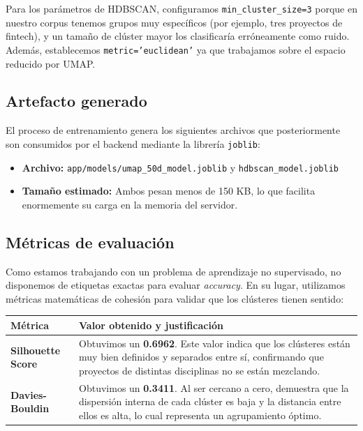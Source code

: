 Para los parámetros de HDBSCAN, configuramos \texttt{min\_cluster\_size=3} porque en nuestro corpus tenemos grupos muy específicos (por ejemplo, tres proyectos de fintech), y un tamaño de clúster mayor los clasificaría erróneamente como ruido. Además, establecemos \texttt{metric='euclidean'} ya que trabajamos sobre el espacio reducido por UMAP.

\subsection{Artefacto generado}

El proceso de entrenamiento genera los siguientes archivos que posteriormente son consumidos por el backend mediante la librería \texttt{joblib}:

\begin{itemize}
  \item \textbf{Archivo:} \texttt{app/models/umap\_50d\_model.joblib} y \texttt{hdbscan\_model.joblib}
  \item \textbf{Tamaño estimado:} Ambos pesan menos de 150 KB, lo que facilita enormemente su carga en la memoria del servidor.
\end{itemize}

\subsection{Métricas de evaluación}

Como estamos trabajando con un problema de aprendizaje no supervisado, no disponemos de etiquetas exactas para evaluar \textit{accuracy}. En su lugar, utilizamos métricas matemáticas de cohesión para validar que los clústeres tienen sentido:

\begin{tabular}{@{}lp{8.5cm}@{}}
  \toprule
  Métrica & Valor obtenido y justificación \\
  \midrule
  \textbf{Silhouette Score} & Obtuvimos un \textbf{0.6962}. Este valor indica que los clústeres están muy bien definidos y separados entre sí, confirmando que proyectos de distintas disciplinas no se están mezclando. \\
  \textbf{Davies-Bouldin} & Obtuvimos un \textbf{0.3411}. Al ser cercano a cero, demuestra que la dispersión interna de cada clúster es baja y la distancia entre ellos es alta, lo cual representa un agrupamiento óptimo. \\
  \bottomrule
\end{tabular}

